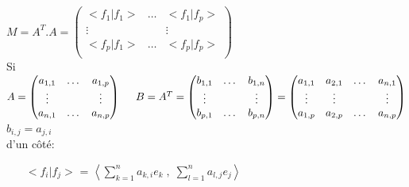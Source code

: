 \documentclass{article}
\newcommand\tab[1][1cm]{\hspace*{#1}}
\begin{document}
$M = A^T . A = \begin{pmatrix}
    <f_1 | f_1> & \dots & <f_1 | f_p>\\
    \vdots & & \vdots\\
    <f_p | f_1> & \dots & <f_p | f_p>\\
\end{pmatrix}$\\
Si $A = \begin{pmatrix}
    a_{1,1} & \dots & a_{1,p}\\
    \vdots & & \vdots\\
    a_{n,1} & \dots & a_{n,p}\\ 
\end{pmatrix} \tab[0.5cm] B = A^T = \begin{pmatrix}
    b_{1,1} & \dots & b_{1,n}\\
    \vdots & & \vdots\\
    b_{p,1} & \dots & b_{p,n}\\ 
\end{pmatrix} = \begin{pmatrix}
    a_{1,1} & a_{2, 1} & \dots & a_{n,1}\\
    \vdots & \vdots & & \vdots\\
    a_{1,p} & a_{2, p} & \dots & a_{n,p}\\ 
\end{pmatrix}$
$b_{i,j} = a_{j,i}$\\

d'un côté:

\begin{itemize}
    \item[$<f_i | f_j>$] = $\left<
        \sum_{k = 1}^n a_{k, i} e_k \; , \; \sum_{l = 1}^n a_{l, j} e_j
    \right>$
\end{itemize}
    
\end{document}
